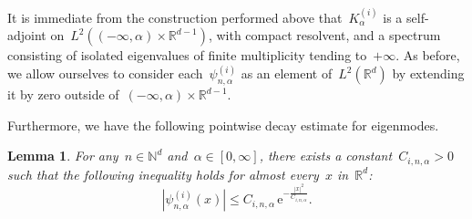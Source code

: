 \documentclass[10pt]{article}
\newcommand{\e}{\mathrm{e}}
\newcommand{\R}{\mathbb{R}}
\newcommand{\N}{\mathbb N}
\newcommand{\1}{\mathbbm 1}
\newcommand{\Ki}[1]{K^{(i)}_{#1}}
\newcommand{\psii}[2]{\psi^{(i)}_{#1,#2}}
\newtheorem{lemma}{Lemma}
\begin{document}
    It is immediate from the construction performed above that~$\Ki{\alpha}$ is a self-adjoint on~$L^2((-\infty,\alpha)\times\R^{d-1})$, with compact resolvent, and a spectrum consisting of isolated eigenvalues of finite multiplicity tending to~$+\infty$.
    As before, we allow ourselves to consider each~$\psii{n}{\alpha}$ as an element of~$L^2(\R^d)$ by extending it by zero outside of~$(-\infty,\alpha)\times\R^{d-1}$.

    Furthermore, we have the following pointwise decay estimate for eigenmodes.
    \begin{lemma}
        For any~$n\in\N^d$ and~$\alpha\in[0,\infty]$, there exists a constant~$C_{i,n,\alpha}>0$ such that the following inequality holds for almost every~$x$ in~$\R^d$:
        \begin{equation}
            \label{eq:exponential_decay}
            |\psii{n}{\alpha}(x)| \leq C_{i,n,\alpha}\,\e^{-\frac{|x|^2}{C_{i,n,\alpha}}}.
        \end{equation}
    \end{lemma}
\end{document}
